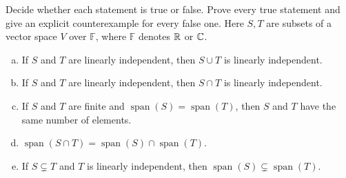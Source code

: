 \begin{exercise}
  \label{ex:hw01:span-and-independence-assertions}
  Decide whether each statement is true or false. Prove every true statement
  and give an explicit counterexample for every false one. Here \(S,T\)
  are subsets of a vector space \(V\) over \(\mathbb F\), where
  \(\mathbb F\) denotes \(\mathbb{R}\) or \(\mathbb{C}\).
  \begin{enumerate}[(a)][2]
    \item If \(S\) and \(T\) are linearly independent, then
      \(S\cup T\) is linearly independent.
    \item If \(S\) and \(T\) are linearly independent, then
      \(S\cap T\) is linearly independent.
    \item If \(S\) and \(T\) are finite and
      \(\operatorname{span}(S)=\operatorname{span}(T)\), then \(S\)
      and \(T\) have the same number of elements.
    \item \(\operatorname{span}(S\cap T)
      =\operatorname{span}(S)\cap\operatorname{span}(T)\).
    \item If \(S\subsetneq T\) and \(T\) is linearly independent, then
      \(\operatorname{span}(S)\subsetneq\operatorname{span}(T)\).
  \end{enumerate}
\end{exercise}
